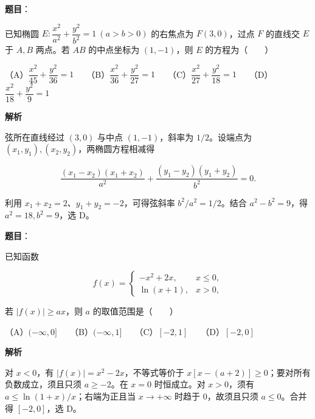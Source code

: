 \begin{answer}

\textbf{题目}：

已知椭圆 $E:\dfrac{x^2}{a^2}+\dfrac{y^2}{b^2}=1\ (a>b>0)$ 的右焦点为 $F(3,0)$，过点 $F$ 的直线交 $E$ 于 $A,B$ 两点。若 $AB$ 的中点坐标为 $(1,-1)$，则 $E$ 的方程为\mbox{（　　）}

（A）$\dfrac{x^2}{45}+\dfrac{y^2}{36}=1$　　（B）$\dfrac{x^2}{36}+\dfrac{y^2}{27}=1$　　（C）$\dfrac{x^2}{27}+\dfrac{y^2}{18}=1$　　（D）$\dfrac{x^2}{18}+\dfrac{y^2}{9}=1$

\textbf{解析}

弦所在直线经过 $(3,0)$ 与中点 $(1,-1)$，斜率为 $1/2$。设端点为 $(x_1,y_1),(x_2,y_2)$，两椭圆方程相减得

\nopagebreak[4]
\[
\frac{(x_1-x_2)(x_1+x_2)}{a^2}
+\frac{(y_1-y_2)(y_1+y_2)}{b^2}=0.
\]

利用 $x_1+x_2=2$、$y_1+y_2=-2$，可得弦斜率 $b^2/a^2=1/2$。结合 $a^2-b^2=9$，得 $a^2=18,b^2=9$，选 D。


\end{answer}
\begin{answer}

\textbf{题目}：

已知函数

\nopagebreak[4]
\[
f(x)=\begin{cases}
-x^2+2x,&x\leqslant0,\\
\ln(x+1),&x>0,
\end{cases}
\]

若 $|f(x)|\geqslant ax$，则 $a$ 的取值范围是\mbox{（　　）}

（A）$(-\infty,0]$　　（B）$(-\infty,1]$　　（C）$[-2,1]$　　（D）$[-2,0]$

\textbf{解析}

对 $x<0$，有 $|f(x)|=x^2-2x$，不等式等价于 $x[x-(a+2)]\geqslant0$；要对所有负数成立，须且只须 $a\geqslant-2$。在 $x=0$ 时恒成立。对 $x>0$，须有 $a\leqslant\ln(1+x)/x$；右端为正且当 $x\to+\infty$ 时趋于 $0$，故须且只须 $a\leqslant0$。合并得 $[-2,0]$，选 D。


\end{answer}
